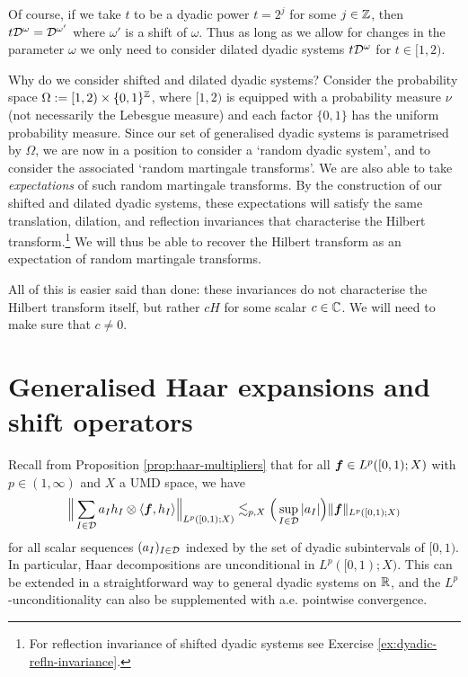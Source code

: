 Of course, if we take $t$ to be a dyadic power $t = 2^{j}$ for some $j \in \mathbb{Z}$, then $t\mathcal{D}^{\omega} = \mathcal{D}^{\omega'}$ where $\omega'$ is a shift of $\omega$.
Thus as long as we allow for changes in the parameter $\omega$ we only need to consider dilated dyadic systems $t\mathcal{D}^{\omega}$ for $t \in [1,2)$.

Why do we consider shifted and dilated dyadic systems?
Consider the probability space $\Omega := [1,2) \times \{0,1\}^{\mathbb{Z}}$, where $[1,2)$ is equipped with a probability measure $\nu$ (not necessarily the Lebesgue measure) and each factor $\{0,1\}$ has the uniform probability measure.
Since our set of generalised dyadic systems is parametrised by $\Omega$, we are now in a position to consider a `random dyadic system', and to consider the associated `random martingale transforms'.
We are also able to take \emph{expectations} of such random martingale transforms.
By the construction of our shifted and dilated dyadic systems, these expectations will satisfy the same translation, dilation, and reflection invariances that characterise the Hilbert transform.\footnote{For reflection invariance of shifted dyadic systems see Exercise \ref{ex:dyadic-refln-invariance}.}
We will thus be able to recover the Hilbert transform as an expectation of random martingale transforms.

All of this is easier said than done: these invariances do not characterise the Hilbert transform itself, but rather $cH$ for some scalar $c \in \mathbb{C}$.
We will need to make sure that $c \neq 0$.

\section{Generalised Haar expansions and shift operators}

Recall from Proposition \ref{prop:haar-multipliers} that for all $\bm{f} \in L^p([0,1);X)$ with $p \in (1,\infty)$ and $X$ a UMD space, we have
\begin{equation*}
  \Big\| \sum_{I \in \mathcal{D}} a_{I} h_{I} \otimes \langle \bm{f}, h_{I} \rangle \Big\|_{L^p([0,1);X)} \lesssim_{p,X} \Big(\sup_{I \in \mathcal{D}} |a_{I}| \Big) \|\bm{f}\|_{L^p([0,1);X)}
\end{equation*}
for all scalar sequences $(a_{I})_{I \in \mathcal{D}}$ indexed by the set of dyadic subintervals of $[0,1)$.
In particular, Haar decompositions are unconditional in $L^p([0,1);X)$.
This can be extended in a straightforward way to general dyadic systems on $\mathbb{R}$, and the $L^p$-unconditionality can also be supplemented with a.e. pointwise convergence.

